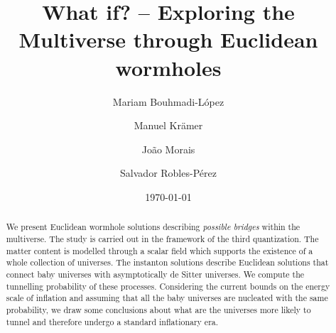 \documentclass[aps,nofootinbib,prd,superscriptaddress,eqsecnum,showpacs,showkeys,preprintnumbers,altaffilletter]{revtex4}
\begin{document}
\title{What if? -- Exploring the Multiverse through Euclidean wormholes}


\author{Mariam Bouhmadi-L\'{o}pez}

\author{Manuel Kr{\"a}mer}

\author{Jo\~ao Morais}

\author{Salvador Robles-P\'{e}rez}


\date{\today}


\begin{abstract}
We present Euclidean wormhole solutions describing {\it possible bridges} within the multiverse. The study is carried out in the framework of the third quantization. The matter content is modelled through a scalar field which supports the existence of a whole collection of universes. The instanton solutions describe Euclidean solutions that connect baby universes with asymptotically de Sitter universes. We compute the tunnelling probability of these processes. Considering the current bounds on the energy  scale of inflation and assuming that all the baby universes are nucleated with the same probability, we draw some conclusions about what are the universes more likely to tunnel and therefore undergo a standard inflationary era.
\end{abstract}


\maketitle


%
%
\end{document}
